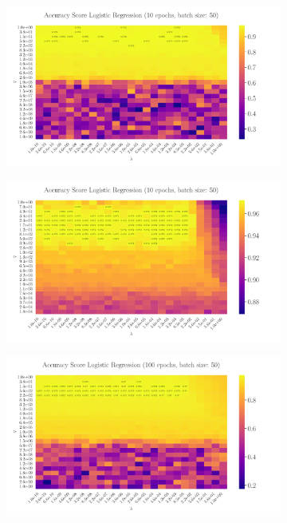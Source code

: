 \documentclass[%
reprint,s
amsmath,amssymb,
aps,
]{revtex4-2}
\begin{document}
\begin{figure}
	\begin{subfigure}{0.41\textwidth}
		\includegraphics[width=\textwidth]{Figures/LogReg25x25_epoch10_batchS50.pdf}
		\label{fig:LogReg25x25_epoch10_bacthS50}
	\end{subfigure}
	\hfill
	\begin{subfigure}{0.41\textwidth}
		\includegraphics[width=\textwidth]{Figures/LogReg25x25_epoch10_batchS50_zoomed.pdf}
		\label{fig:LogReg25x25_epoch10_bacthS50_zoomed}
	\end{subfigure}
\hfill\newline
	\begin{subfigure}{0.41\textwidth}
		\includegraphics[width=\textwidth]{Figures/LogReg25x25_epoch100_batchS50.pdf}

\end{subfigure}
\end{figure}
\end{document}
